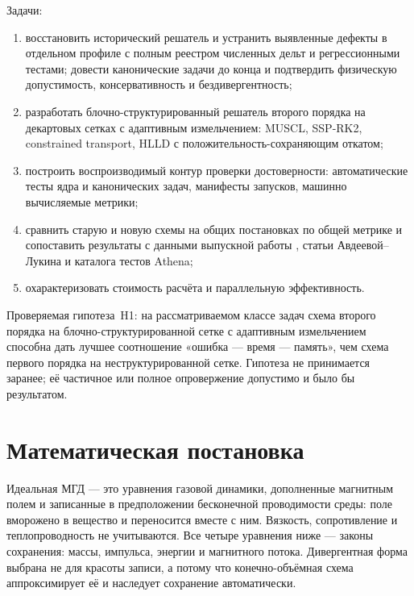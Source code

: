 \documentclass[12pt,a4paper]{article}
\begin{document}
Задачи:
\begin{enumerate}[nosep]
\item восстановить исторический решатель и устранить выявленные дефекты в
  отдельном профиле с полным реестром численных дельт и регрессионными тестами;
  довести канонические задачи до конца и подтвердить физическую допустимость,
  консервативность и бездивергентность;
\item разработать блочно-структурированный решатель второго порядка на
  декартовых сетках с адаптивным измельчением: MUSCL, SSP-RK2, constrained
  transport, HLLD с положительность-сохраняющим откатом;
\item построить воспроизводимый контур проверки достоверности: автоматические
  тесты ядра и канонических задач, манифесты запусков, машинно вычисляемые
  метрики;
\item сравнить старую и новую схемы на общих постановках по общей метрике и
  сопоставить результаты с данными выпускной работы \cite{shamanov2025}, статьи
  Авдеевой--Лукина \cite{avdeeva2019} и каталога тестов Athena;
\item охарактеризовать стоимость расчёта и параллельную эффективность.
\end{enumerate}

Проверяемая гипотеза~H1: на рассматриваемом классе задач схема второго порядка
на блочно-структурированной сетке с адаптивным измельчением способна дать лучшее
соотношение «ошибка — время — память», чем схема первого порядка на
неструктурированной сетке. Гипотеза не принимается заранее; её частичное или
полное опровержение допустимо и было бы результатом.

\section{Математическая постановка}

Идеальная МГД — это уравнения газовой динамики, дополненные магнитным полем и
записанные в предположении бесконечной проводимости среды: поле вморожено в
вещество и переносится вместе с ним. Вязкость, сопротивление и теплопроводность
не учитываются. Все четыре уравнения ниже — законы сохранения: массы, импульса,
энергии и магнитного потока. Дивергентная форма выбрана не для красоты записи, а
потому что конечно-объёмная схема аппроксимирует её и наследует
сохранение автоматически.
\end{document}
